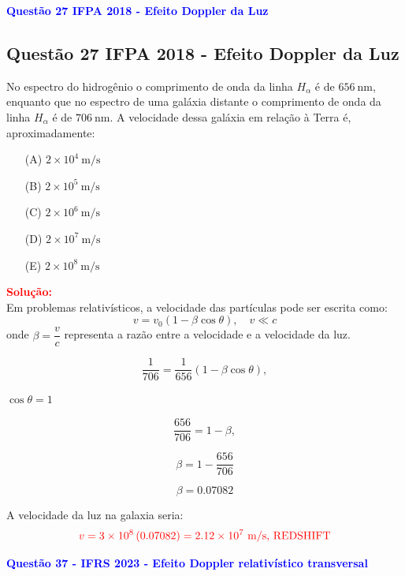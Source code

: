 \begin{flushleft}
\textbf{\textcolor{blue}{\Large Quest\~ao 27 IFPA 2018 - Efeito Doppler da Luz}}\\
\noindent

\subsection{Quest\~ao 27 IFPA 2018 - Efeito Doppler da Luz}

No espectro do hidrogênio o comprimento de onda da linha $H_\alpha$ é de $656\ \text{nm}$, enquanto que no 
espectro de uma galáxia distante o comprimento de onda da linha $H_\alpha$ é de $706\ \text{nm}$. A velocidade dessa 
galáxia em relação à Terra é, aproximadamente:

\begin{itemize}
\item[(A)] $2 \times 10^4\ \text{m/s}$
\item[(B)] $2 \times 10^5\ \text{m/s}$
\item[(C)] $2 \times 10^6\ \text{m/s}$
\item[(D)] $2 \times 10^7\ \text{m/s}$
\item[(E)] $2 \times 10^8\ \text{m/s}$
\end{itemize}

\vspace{0.5cm}

\textcolor{red}{\textbf{Solução:}}\\

Em problemas relativ\'isticos, a velocidade das part\'iculas pode ser escrita como:
\[
v = v_0 \left(1 - \beta \cos\theta \right), \quad v \ll c 
\]
onde $\beta = \dfrac{v}{c}$ representa a raz\~ao entre a velocidade e a velocidade da luz.  

\[
\frac{1}{706} = \frac{1}{656}(1 - \beta \cos\theta),
\]

$\cos\theta = 1$

\[
\frac{656}{706} = 1 - \beta,
\]

\[
\beta  = 1 - \frac{656}{706}
\]

\[
\boxed{
\beta  = 0.07082
}
\]

A velocidade da luz na galaxia seria:
\[
\textcolor{red}{v = 3 \times 10^8 \left(0.07082 \right) = 2.12 \times 10^7\ \text{m/s,  REDSHIFT}}
\]


\begin{flushleft}
\textbf{\textcolor{blue}{\Large Quest\~ao 37 - IFRS 2023 - Efeito Doppler relativ\'istico transversal}}\\
\noindent


\end{flushleft}
\end{flushleft}
